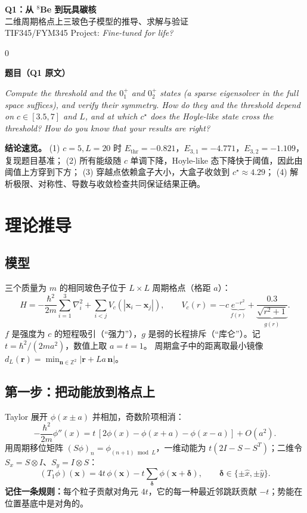 \documentclass[UTF8,fontset=fandol,11pt,a4paper]{ctexart}
\newenvironment{keybox}[1]
  {\par\noindent\setlength{\fboxsep}{8pt}\setlength{\fboxrule}{0.6pt}%
   \begin{lrbox}{0}\begin{minipage}{\dimexpr\linewidth-2\fboxsep-2\fboxrule\relax}%
   {\bfseries\color{blue!45!black}#1}\par\smallskip}
  {\end{minipage}\end{lrbox}\fcolorbox{blue!45!black}{blue!3}{\usebox{0}}\par}
\newcommand{\rr}{\mathbf r}
\newcommand{\dd}{\boldsymbol\delta}
\newcommand{\Ethr}{E_{\mathrm{thr}}}
\begin{document}
\begin{center}
{\LARGE\bfseries Q1：从 $^8$Be 到玩具碳核}\\[6pt]
{\large 二维周期格点上三玻色子模型的推导、求解与验证}\\[4pt]
{\small TIF345/FYM345 \quad Project: \textit{Fine-tuned for life?}}
\end{center}

\begin{keybox}{题目（Q1 原文）}
\textit{Compute the threshold and the $0^+_1$ and $0^+_2$ states (a sparse eigensolver in the full space suffices),
and verify their symmetry. How do they and the threshold depend on $c\in[3.5,7]$ and $L$, and at which $c^\star$
does the Hoyle-like state cross the threshold? How do you know that your results are right?}

\medskip
\textbf{结论速览。}
(1) $c=5,L=20$ 时 $\Ethr=-0.821$，$E_{3,1}=-4.771$，$E_{3,2}=-1.109$，复现题目基准；
(2) 所有能级随 $c$ 单调下降，Hoyle-like 态下降快于阈值，因此由阈值上方穿到下方；
(3) 穿越点依赖盒子大小，大盒子收敛到 $c^\star\approx4.29$；
(4) 解析极限、对称性、导数与收敛检查共同保证结果正确。
\end{keybox}

\section{理论推导}

\subsection{模型}
三个质量为 $m$ 的相同玻色子位于 $L\times L$ 周期格点（格距 $a$）：
\begin{equation}
H=-\frac{\hbar^2}{2m}\sum_{i=1}^{3}\nabla_i^2+\sum_{i<j}V_c(|\mathbf x_i-\mathbf x_j|),\qquad
V_c(r)=-c\,\underbrace{e^{-r^2}}_{f(r)}+\underbrace{\frac{0.3}{\sqrt{r^2+1}}}_{g(r)}.
\end{equation}
$f$ 是强度为 $c$ 的短程吸引（“强力”），$g$ 是弱的长程排斥（“库仑”）。记 $t=\hbar^2/(2ma^2)$，数值上取 $a=t=1$。
周期盒子中的距离取最小镜像 $d_L(\rr)=\min_{\mathbf n\in\mathbb Z^2}|\rr+La\,\mathbf n|$。

\subsection{第一步：把动能放到格点上}
Taylor 展开 $\phi(x\pm a)$ 并相加，奇数阶项相消：
\begin{equation}
-\frac{\hbar^2}{2m}\phi''(x)=t\,[2\phi(x)-\phi(x+a)-\phi(x-a)]+O(a^2).
\end{equation}
用周期移位矩阵 $(S\phi)_n=\phi_{(n+1)\bmod L}$，一维动能为 $t(2I-S-S^T)$；二维令 $S_x=S\otimes I$、$S_y=I\otimes S$：
\begin{equation}
(T_1\phi)(\mathbf x)=4t\,\phi(\mathbf x)-t\sum_{\dd}\phi(\mathbf x+\dd),\qquad \dd\in\{\pm\hat x,\pm\hat y\}.
\end{equation}
\textbf{记住一条规则：}每个粒子贡献对角元 $4t$，它的每一种最近邻跳跃贡献 $-t$；势能在位置基底中是对角的。
\end{document}
